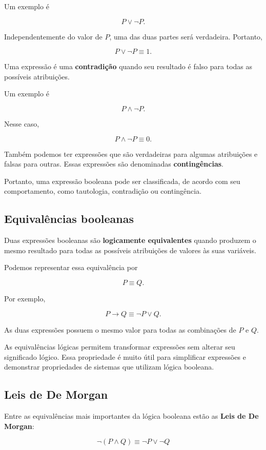 \documentclass[
  brazilian,
  letterpaper,
]{book}
\theoremstyle{plain}
\theoremstyle{definition}
\theoremstyle{remark}
\begin{document}
Um exemplo é

\[
P\vee\neg P.
\]

Independentemente do valor de \(P\), uma das duas partes será
verdadeira. Portanto,

\[
P\vee\neg P\equiv1.
\]

Uma expressão é uma \textbf{contradição} quando seu resultado é falso
para todas as possíveis atribuições.

Um exemplo é

\[
P\wedge\neg P.
\]

Nesse caso,

\[
P\wedge\neg P\equiv0.
\]

Também podemos ter expressões que são verdadeiras para algumas
atribuições e falsas para outras. Essas expressões são denominadas
\textbf{contingências}.

Portanto, uma expressão booleana pode ser classificada, de acordo com
seu comportamento, como tautologia, contradição ou contingência.

\subsection{Equivalências booleanas}\label{equivaluxeancias-booleanas}

Duas expressões booleanas são \textbf{logicamente equivalentes} quando
produzem o mesmo resultado para todas as possíveis atribuições de
valores às suas variáveis.

Podemos representar essa equivalência por

\[
P\equiv Q.
\]

Por exemplo,

\[
P\rightarrow Q
\equiv
\neg P\vee Q.
\]

As duas expressões possuem o mesmo valor para todas as combinações de
\(P\) e \(Q\).

As equivalências lógicas permitem transformar expressões sem alterar seu
significado lógico. Essa propriedade é muito útil para simplificar
expressões e demonstrar propriedades de sistemas que utilizam lógica
booleana.

\subsection{Leis de De Morgan}\label{leis-de-de-morgan}

Entre as equivalências mais importantes da lógica booleana estão as
\textbf{Leis de De Morgan}:

\[
\neg(P\wedge Q)
\equiv
\neg P\vee\neg Q
\]
\end{document}
